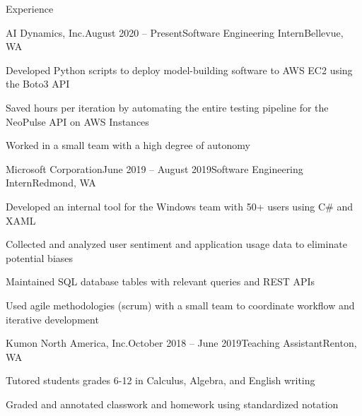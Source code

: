 \documentclass{resume} %
\begin{document}
\begin{rSection}{Experience}

\begin{rSubsection}{AI Dynamics, Inc.}{August 2020 – Present}{Software Engineering Intern}{Bellevue, WA}
\item Developed Python scripts to deploy model-building software to AWS EC2 using the Boto3 API
\item Saved hours per iteration by automating the entire testing pipeline for the NeoPulse API on AWS Instances
\item Worked in a small team with a high degree of autonomy
\end{rSubsection}

\begin{rSubsection}{Microsoft Corporation}{June 2019 – August 2019}{Software Engineering Intern}{Redmond, WA}
\item Developed an internal tool for the Windows team with 50+ users using C\# and XAML
\item Collected and analyzed user sentiment and application usage data to eliminate potential biases
\item Maintained SQL database tables with relevant queries and REST APIs
\item Used agile methodologies (scrum) with a small team to coordinate workflow and iterative development
\end{rSubsection}

\begin{rSubsection}{Kumon North America, Inc.}{October 2018 – June 2019}{Teaching Assistant}{Renton, WA}
\item Tutored students grades 6-12 in Calculus, Algebra, and English writing
\item Graded and annotated classwork and homework using standardized notation
\end{rSubsection}

\end{rSection}

\end{document}
